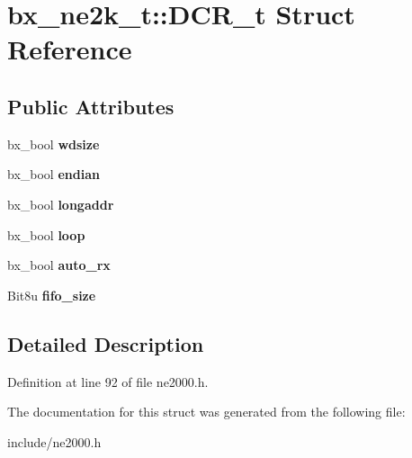\hypertarget{structbx__ne2k__t_1_1DCR__t}{\section{bx\-\_\-ne2k\-\_\-t\-:\-:D\-C\-R\-\_\-t Struct Reference}
\label{structbx__ne2k__t_1_1DCR__t}
}
\subsection*{Public Attributes}
\begin{DoxyCompactItemize}
\item 
\hypertarget{structbx__ne2k__t_1_1DCR__t_a72783771790cb1a99eef08228cc3aec0}{bx\-\_\-bool {\bfseries wdsize}}\label{structbx__ne2k__t_1_1DCR__t_a72783771790cb1a99eef08228cc3aec0}

\item 
\hypertarget{structbx__ne2k__t_1_1DCR__t_a718642a32f683f26c086834abdd2914f}{bx\-\_\-bool {\bfseries endian}}\label{structbx__ne2k__t_1_1DCR__t_a718642a32f683f26c086834abdd2914f}

\item 
\hypertarget{structbx__ne2k__t_1_1DCR__t_a3d44458b1795d7e45f694c4ccfc68341}{bx\-\_\-bool {\bfseries longaddr}}\label{structbx__ne2k__t_1_1DCR__t_a3d44458b1795d7e45f694c4ccfc68341}

\item 
\hypertarget{structbx__ne2k__t_1_1DCR__t_a5d10466f811c568a06f8faa087f75c8b}{bx\-\_\-bool {\bfseries loop}}\label{structbx__ne2k__t_1_1DCR__t_a5d10466f811c568a06f8faa087f75c8b}

\item 
\hypertarget{structbx__ne2k__t_1_1DCR__t_ae1b42bf568b6d11ce908eede17683bb2}{bx\-\_\-bool {\bfseries auto\-\_\-rx}}\label{structbx__ne2k__t_1_1DCR__t_ae1b42bf568b6d11ce908eede17683bb2}

\item 
\hypertarget{structbx__ne2k__t_1_1DCR__t_a2a3d5dda84accf0b9a0c811db766de9b}{Bit8u {\bfseries fifo\-\_\-size}}\label{structbx__ne2k__t_1_1DCR__t_a2a3d5dda84accf0b9a0c811db766de9b}

\end{DoxyCompactItemize}


\subsection{Detailed Description}


Definition at line 92 of file ne2000.\-h.



The documentation for this struct was generated from the following file\-:\begin{DoxyCompactItemize}
\item 
include/ne2000.\-h\end{DoxyCompactItemize}
